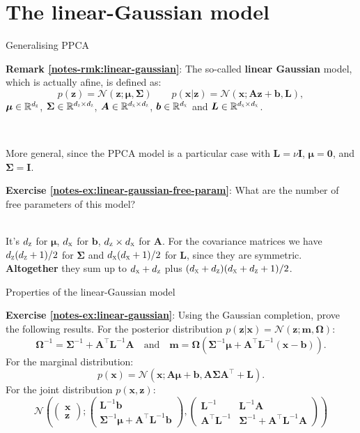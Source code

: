 \documentclass{beamer}
\newcommand{\bs}[1]{\boldsymbol{#1}}
\newcommand{\exercise}[2]{\noindent\colorbox{blue!10}{\parbox{0.995\textwidth}{\textbf{Exercise \ref{notes-ex:#1}}: #2}}\\}
\newcommand{\remark}[2]{\noindent\colorbox{red!10}{\parbox{0.995\textwidth}{\textbf{Remark \ref{notes-rmk:#1}}: #2}}\\}
\begin{document}
\section{The linear-Gaussian model}

\begin{frame}{Generalising PPCA}
\remark{linear-gaussian}{The so-called \textbf{linear Gaussian} model, which is actually afine, is defined as:
 \[
  p(\bs{z}) = \mathcal{N}(\bs{z};\bs{\mu},\bs{\Sigma}) \qquad 
  p(\bs{x}|\bs{z}) = \mathcal{N}(\bs{x};\bs{A}\bs{z}+\bs{b},\bs{L}),
 \]
 $\bs{\mu}\in\mathbb{R}^{d_{\textsc{z}}}$, $\bs{\Sigma}\in\mathbb{R}^{d_{\textsc{z}}\times d_{\textsc{z}}}$, $\bs{A}\in\mathbb{R}^{d_{\textsc{x}}\times d_{\textsc{z}}}$, $\bs{b}\in\mathbb{R}^{d_{\textsc{x}}}$ and $\bs{L}\in\mathbb{R}^{d_{\textsc{x}}\times d_{\textsc{x}}}$. 
}\vspace{5mm}

More general, since the PPCA model is a particular case with $\bs{L}=\nu\bs{I}$, $\bs{\mu}=\bs{0}$, and $\bs{\Sigma}=\bs{I}$.\vspace{5mm}

\exercise{linear-gaussian-free-param}{What are the number of free parameters of this model?}\vspace{2mm}\pause It's $d_\textsc{z}$ for $\bs{\mu}$, $d_\textsc{x}$ for $\bs{b}$, $d_\textsc{z}\times d_\textsc{x}$ for $\bs{A}$. For the covariance matrices we have $d_\textsc{z}(d_\textsc{z}+1)/2$ for $\bs{\Sigma}$ and $d_\textsc{x}(d_\textsc{x}+1)/2$ for $\bs{L}$, since they are symmetric.\vspace{2mm}\\
\textbf{Altogether} they sum up to $d_\textsc{x}+d_\textsc{z}$ plus $(d_\textsc{x}+d_\textsc{z})(d_\textsc{x}+d_\textsc{z}+1)/2$.
\end{frame}

\begin{frame}{Properties of the linear-Gaussian model}
\exercise{linear-gaussian}{Using the Gaussian completion, prove the following results. For the posterior distribution $p(\bs{z}|\bs{x}) = \mathcal{N}(\bs{z};\bs{m},\bs{\Omega})$:
\[
 \bs{\Omega}^{-1} = \bs{\Sigma}^{-1}+\bs{A}^\top\bs{L}^{-1}\bs{A} \quad\text{and}\quad \bs{m}=\bs{\Omega}(\bs{\Sigma}^{-1}\bs{\mu}+\bs{A}^\top\bs{L}^{-1}(\bs{x}-\bs{b})). 
\]
For the marginal distribution:
\[
 p(\bs{x}) = \mathcal{N}(\bs{x};\bs{A}\bs{\mu}+\bs{b},\bs{A}\bs{\Sigma}\bs{A}^\top + \bs{L}).
\]
For the joint distribution $p(\bs{x},\bs{z})$:
\[
 \mathcal{N} \left(\left(\begin{array}{c}\bs{x}\\\bs{z}\end{array}\right); \left(\begin{array}{c}\bs{L}^{-1}\bs{b}\\\bs{\Sigma}^{-1}\bs{\mu}+\bs{A}^\top\bs{L}^{-1}\bs{b}\end{array}\right),\left(\begin{array}{cc}\bs{L}^{-1} & \bs{L}^{-1}\bs{A}\\\bs{A}^\top\bs{L}^{-1} & \bs{\Sigma}^{-1}+\bs{A}^\top\bs{L}^{-1}\bs{A}\end{array}\right)\right)
\]
}
\end{frame}
\end{document}
